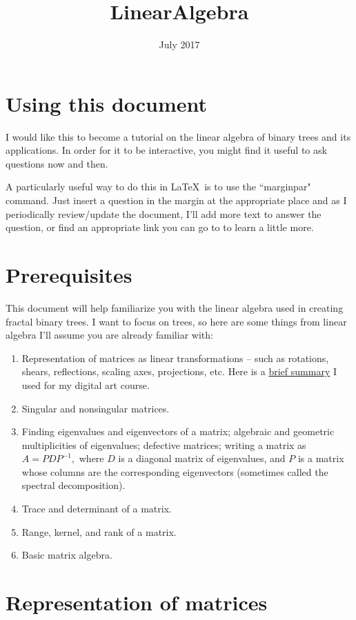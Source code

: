 \documentclass{article}
\title{LinearAlgebra}
\date{July 2017}
\begin{document}
\section{Using this document}

I would like this to become a tutorial on the linear algebra of binary trees and its applications. In order for it to be interactive, you might find it useful to ask questions now and then.

A particularly useful way to do this in \LaTeX\ is to use the ``marginpar" command. Just insert a question in the margin at the appropriate place and as I periodically review/update the document, I'll add more text to answer the question, or find an appropriate link you can go to to learn a little more.

\section{Prerequisites}
This document will help familiarize you with the linear algebra used in creating fractal binary trees. I want to focus on trees, so here are some things from linear algebra I'll assume you are already familiar with:
\begin{enumerate}
\item Representation of matrices as linear transformations -- such as rotations, shears, reflections, scaling axes, projections, etc. Here is a \href{http://www.vincematsko.com/Spring2017/MAT195/LinAlgGuide.pdf}{brief summary} I used for my digital art course.

\item Singular and nonsingular matrices.

\item Finding eigenvalues and eigenvectors of a matrix; algebraic and geometric multiplicities of eigenvalues; defective matrices; writing a matrix as $A=PDP^{-1},$ where $D$ is a diagonal matrix of eigenvalues, and $P$ is a matrix whose columns are the corresponding eigenvectors (sometimes called the spectral decomposition).

\item Trace and determinant of a matrix.

\item Range, kernel, and rank of a matrix.

\item Basic matrix algebra.
\end{enumerate}

\section{Representation of matrices}
\end{document}
